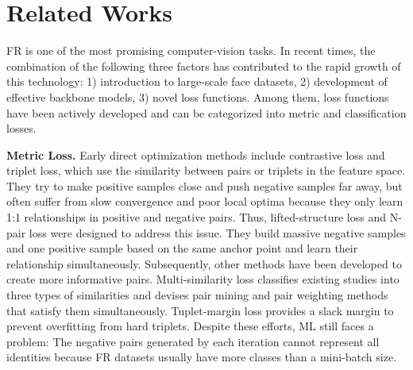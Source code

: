 \documentclass[10pt,twocolumn]{article}
\begin{document}
\section{Related Works}
FR is one of the most promising computer-vision tasks. In recent times, the combination of the following three factors has contributed to the rapid growth of this technology: 1) introduction to large-scale face datasets\cite{guo2016ms, yi2014learning, sun2015deeply}, 2) development of effective backbone models\cite{krizhevsky2012imagenet, he2016deep, simonyan2014very, hu2018squeeze, szegedy2015going}, 3) novel loss functions\cite{wang2018cosface, deng2019arcface, meng2021magface}. Among them, loss functions have been actively developed and can be categorized into metric and classification losses.

\noindent\textbf{Metric Loss.} Early direct optimization methods include contrastive loss\cite{chopra2005learning, hadsell2006dimensionality} and triplet loss\cite{schroff2015facenet, hoffer2015deep}, which use the similarity between pairs or triplets in the feature space. They try to make positive samples close and push negative samples far away, but often suffer from slow convergence and poor local optima because they only learn 1:1 relationships in positive and negative pairs. Thus, lifted-structure loss\cite{oh2016deep} and N-pair loss\cite{sohn2016improved} were designed to address this issue. They build massive negative samples and one positive sample based on the same anchor point and learn their relationship simultaneously. Subsequently, other methods have been developed to create more informative pairs. Multi-similarity loss\cite{wang2019multi} classifies existing studies into three types of similarities and devises pair mining and pair weighting methods that satisfy them simultaneously. Tuplet-margin loss\cite{yu2019deep} provides a slack margin to prevent overfitting from hard triplets. Despite these efforts, ML still faces a problem: The negative pairs generated by each iteration cannot represent all identities because FR datasets\cite{guo2016ms, yi2014learning, sun2015deeply} usually have more classes than a mini-batch size.
\end{document}
